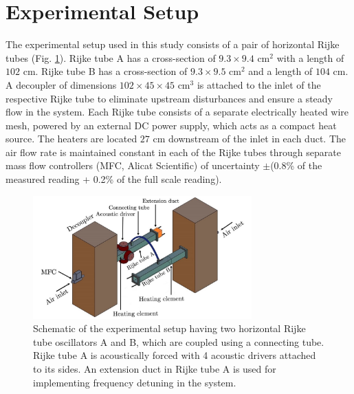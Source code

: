 \documentclass[%
preprint,
 amsmath,amssymb,
 aps,
 pra,
]{revtex4-2}
\begin{document}

\section{Experimental Setup}
\label{2. Experimental Setup}

The experimental setup used in this study consists of a pair of horizontal Rijke tubes (Fig. \ref{setup}). Rijke tube A has a cross-section of $ 9.3 \times 9.4$ $\text{cm}^2$  with a length of $102$ cm. Rijke tube B has a cross-section of $ 9.3 \times 9.5$ $\text{cm}^2$ and a length of $104$ cm. A decoupler of dimensions $ 102 \times 45 \times 45$ $\text{cm}^3$ is attached to the inlet of the respective Rijke tube to eliminate upstream disturbances and ensure a steady flow in the system. Each Rijke tube consists of a separate electrically heated wire mesh, powered by an external DC power supply, which acts as a compact heat source. The heaters are located $27$ cm downstream of the inlet in each duct. The air flow rate is maintained constant in each of the Rijke tubes through separate mass flow controllers (MFC, Alicat Scientific) of uncertainty $\pm$(0.8\% of the measured reading + 0.2\% of the full scale reading).

\begin{figure}[t!]
\centering
\includegraphics[width=0.75\textwidth]{fig1.jpg}
\caption{\label{setup} Schematic of the experimental setup having two horizontal Rijke tube oscillators A and B, which are coupled using a connecting tube. Rijke tube A is acoustically forced with 4 acoustic drivers attached to its sides. An extension duct in Rijke tube A is used for implementing frequency detuning in the system.}
\end{figure}
\end{document}
